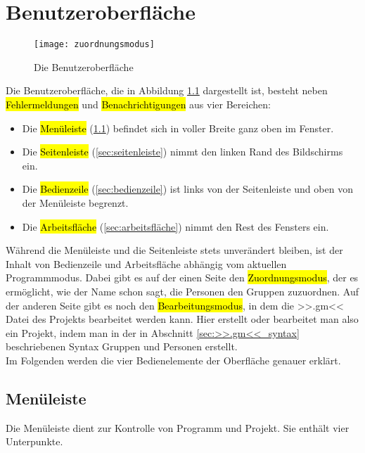 \chapter{Benutzeroberfläche}
\label{ch:benutzeroberfläche}

\begin{figure}
	\texttt{[image: zuordnungsmodus]}
	\caption{Die Benutzeroberfläche}
	\label{fig:die_benutzeroberfläche}
\end{figure}

Die Benutzeroberfläche, die in Abbildung \ref{fig:die_benutzeroberfläche} dargestellt ist, besteht neben \hl{Fehlermeldungen} und \hl{Benachrichtigungen} aus vier Bereichen:
\begin{itemize}
	\item Die \hl{Menüleiste} (\ref{sec:menüleiste}) befindet sich in voller Breite ganz oben im Fenster.
	\item Die \hl{Seitenleiste} (\ref{sec:seitenleiste}) nimmt den linken Rand des Bildschirms ein.
	\item Die \hl{Bedienzeile} (\ref{sec:bedienzeile}) ist links von der Seitenleiste und oben von der Menüleiste begrenzt.
	\item Die \hl{Arbeitsfläche} (\ref{sec:arbeitsfläche}) nimmt den Rest des Fensters ein.
\end{itemize}
Während die Menüleiste und die Seitenleiste stets unverändert bleiben, ist der Inhalt von Bedienzeile und Arbeitsfläche abhängig vom aktuellen Programmmodus. Dabei gibt es auf der einen Seite den \hl{Zuordnungsmodus}, der es ermöglicht, wie der Name schon sagt, die Personen den Gruppen zuzuordnen. Auf der anderen Seite gibt es noch den \hl{Bearbeitungsmodus}, in dem die >>.gm<< Datei des Projekts bearbeitet werden kann. Hier erstellt oder bearbeitet man also ein Projekt, indem man in der in Abschnitt \ref{sec:>>.gm<<_syntax} beschriebenen Syntax Gruppen und Personen erstellt.\\
Im Folgenden werden die vier Bedienelemente der Oberfläche genauer erklärt.

\section{Menüleiste}
\label{sec:menüleiste}

Die Menüleiste dient zur Kontrolle von Programm und Projekt. Sie enthält vier Unterpunkte.

